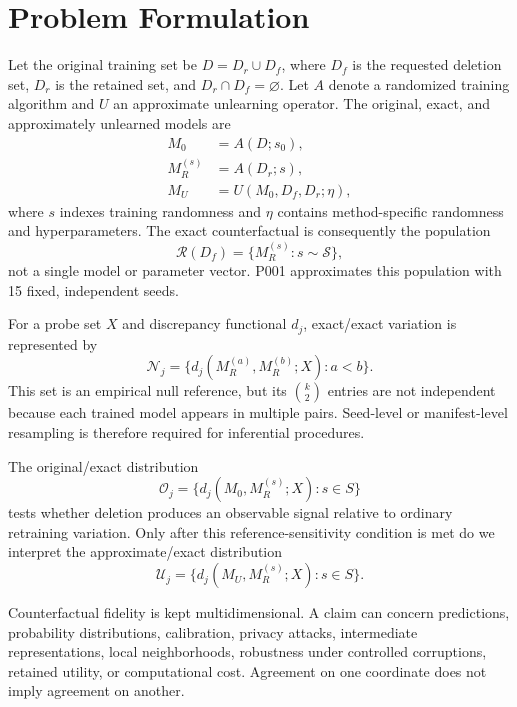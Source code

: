 \section{Problem Formulation}
Let the original training set be $D=D_r\cup D_f$, where $D_f$ is the requested deletion
set, $D_r$ is the retained set, and $D_r\cap D_f=\varnothing$. Let $A$ denote a randomized
training algorithm and $U$ an approximate unlearning operator. The original, exact, and
approximately unlearned models are
\begin{align}
M_0 &= A(D;s_0),\\
M_R^{(s)} &= A(D_r;s),\\
M_U &= U(M_0,D_f,D_r;\eta),
\end{align}
where $s$ indexes training randomness and $\eta$ contains method-specific randomness and
hyperparameters. The exact counterfactual is consequently the population
\begin{equation}
\mathcal{R}(D_f)=\{M_R^{(s)}:s\sim\mathcal{S}\},
\end{equation}
not a single model or parameter vector. P001 approximates this population with 15 fixed,
independent seeds.

For a probe set $X$ and discrepancy functional $d_j$, exact/exact variation is represented
by
\begin{equation}
\mathcal{N}_j=\{d_j(M_R^{(a)},M_R^{(b)};X):a<b\}.
\end{equation}
This set is an empirical null reference, but its $\binom{k}{2}$ entries are not independent
because each trained model appears in multiple pairs. Seed-level or manifest-level
resampling is therefore required for inferential procedures.

The original/exact distribution
\begin{equation}
\mathcal{O}_j=\{d_j(M_0,M_R^{(s)};X):s\in S\}
\end{equation}
tests whether deletion produces an observable signal relative to ordinary retraining
variation. Only after this reference-sensitivity condition is met do we interpret the
approximate/exact distribution
\begin{equation}
\mathcal{U}_j=\{d_j(M_U,M_R^{(s)};X):s\in S\}.
\end{equation}

Counterfactual fidelity is kept multidimensional. A claim can concern predictions,
probability distributions, calibration, privacy attacks, intermediate representations,
local neighborhoods, robustness under controlled corruptions, retained utility, or
computational cost. Agreement on one coordinate does not imply agreement on another.
